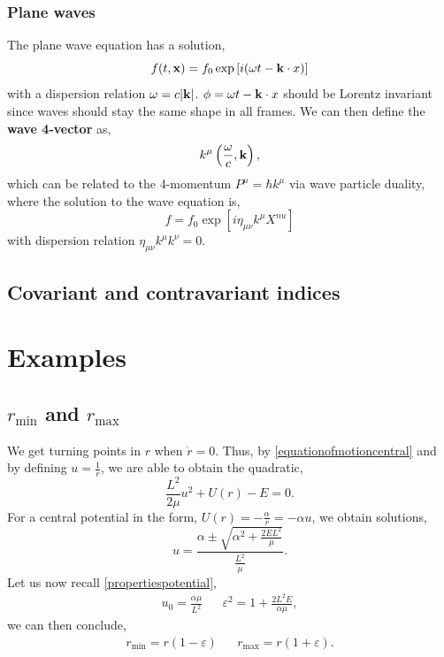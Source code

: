 \documentclass{book}
\begin{document}
\subsection{Plane waves}
The plane wave equation has a solution,
\begin{equation}
	f(t,\vb{x}) = f_0\exp\left[i(\omega t - \vb{k}\cdot{x})\right]
\end{equation}
with a dispersion relation $\omega = c|\vb{k}|$. $\phi = \omega t - \vb{k}\cdot{x}$ should be Lorentz invariant since waves should stay the same shape in all frames. We can then define the \textbf{wave 4-vector} as,
\begin{equation}
	k^{\mu} \left(\frac{\omega}{c},\vb{k}\right),
\end{equation}
which can be related to the 4-momentum $P^{\mu} = \hbar k^{\mu}$ via wave particle duality, where the solution to the wave equation is,
\begin{equation}
	f = f_0 \exp\left[i\eta_{\mu\nu}k^{\mu}X^{nu}\right]
\end{equation}
with dispersion relation $\eta_{\mu\nu}k^{\mu}k^{\nu} = 0$.

\section{Covariant and contravariant indices}
\appendix
\chapter{Examples}
\section{$r_{\text{min}}$ and $r_{\text{max}}$}
We get turning points in $r$ when $\Dot{r} = 0$. Thus, by \eqref{equationofmotioncentral} and by defining $u = \frac{1}{r}$, we are able to obtain the quadratic,
\begin{equation}
    \frac{L^2}{2\mu}u^2 + U(r) - E = 0.
\end{equation}
For a central potential in the form, $U(r) = -\frac{\alpha}{r} = -\alpha u$, we obtain solutions,
\begin{equation}
    u = \frac{\alpha \pm \sqrt{\alpha^2 + \frac{2EL^2}{\mu}}}{\frac{L^2}{\mu}}.
\end{equation}
Let us now recall \eqref{propertiespotential}, 
\begin{align}
    u_0 = \frac{\alpha \mu}{L^2} && \varepsilon^2 = 1 + \frac{2L^2E}{\alpha \mu},
\end{align}
we can then conclude,
\begin{align}
    r_\text{min} = r(1-\varepsilon) && r_{\text{max}} = r(1+\varepsilon).
\end{align}
\end{document}
